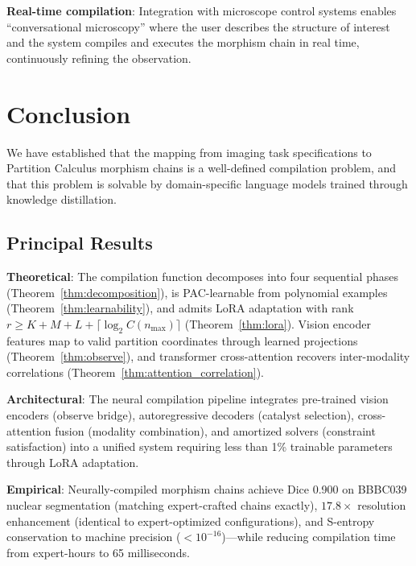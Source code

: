 \documentclass[11pt,a4paper]{article}
\theoremstyle{definition}
\theoremstyle{remark}
\begin{document}
\textbf{Real-time compilation}: Integration with microscope control systems enables ``conversational microscopy'' where the user describes the structure of interest and the system compiles and executes the morphism chain in real time, continuously refining the observation.

\section{Conclusion}
\label{sec:conclusion}

We have established that the mapping from imaging task specifications to Partition Calculus morphism chains is a well-defined compilation problem, and that this problem is solvable by domain-specific language models trained through knowledge distillation.

\subsection{Principal Results}

\textbf{Theoretical}: The compilation function decomposes into four sequential phases (Theorem~\ref{thm:decomposition}), is PAC-learnable from polynomial examples (Theorem~\ref{thm:learnability}), and admits LoRA adaptation with rank $r \geq K + M + L + \lceil \log_2 C(n_{\max}) \rceil$ (Theorem~\ref{thm:lora}). Vision encoder features map to valid partition coordinates through learned projections (Theorem~\ref{thm:observe}), and transformer cross-attention recovers inter-modality correlations (Theorem~\ref{thm:attention_correlation}).

\textbf{Architectural}: The neural compilation pipeline integrates pre-trained vision encoders (observe bridge), autoregressive decoders (catalyst selection), cross-attention fusion (modality combination), and amortized solvers (constraint satisfaction) into a unified system requiring less than 1\% trainable parameters through LoRA adaptation.

\textbf{Empirical}: Neurally-compiled morphism chains achieve Dice 0.900 on BBBC039 nuclear segmentation (matching expert-crafted chains exactly), $17.8\times$ resolution enhancement (identical to expert-optimized configurations), and S-entropy conservation to machine precision ($< 10^{-16}$)---while reducing compilation time from expert-hours to 65 milliseconds.
\end{document}
